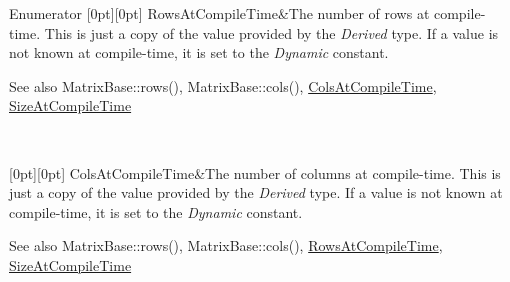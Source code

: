 \begin{DoxyEnumFields}{Enumerator}
[0pt][0pt]{}\mbox{\label{class_eigen_1_1_dense_base_a86241c772c74c04eeeb0480b99c5ab77adb37c78ebbf15aa20b65c3b70415a1ab}} 
Rows\+At\+Compile\+Time&The number of rows at compile-\/time. This is just a copy of the value provided by the {\itshape Derived} type. If a value is not known at compile-\/time, it is set to the {\itshape Dynamic} constant. \begin{DoxySeeAlso}{See also}
Matrix\+Base\+::rows(), Matrix\+Base\+::cols(), \mbox{\hyperlink{class_eigen_1_1_dense_base_a86241c772c74c04eeeb0480b99c5ab77a787f85fd67ee5985917eb2cef6e70441}{Cols\+At\+Compile\+Time}}, \mbox{\hyperlink{class_eigen_1_1_dense_base_a86241c772c74c04eeeb0480b99c5ab77a25cb495affdbd796198462b8ef06be91}{Size\+At\+Compile\+Time}} 
\end{DoxySeeAlso}
\\
\hline

[0pt][0pt]{}\mbox{\label{class_eigen_1_1_dense_base_a86241c772c74c04eeeb0480b99c5ab77a787f85fd67ee5985917eb2cef6e70441}} 
Cols\+At\+Compile\+Time&The number of columns at compile-\/time. This is just a copy of the value provided by the {\itshape Derived} type. If a value is not known at compile-\/time, it is set to the {\itshape Dynamic} constant. \begin{DoxySeeAlso}{See also}
Matrix\+Base\+::rows(), Matrix\+Base\+::cols(), \mbox{\hyperlink{class_eigen_1_1_dense_base_a86241c772c74c04eeeb0480b99c5ab77adb37c78ebbf15aa20b65c3b70415a1ab}{Rows\+At\+Compile\+Time}}, \mbox{\hyperlink{class_eigen_1_1_dense_base_a86241c772c74c04eeeb0480b99c5ab77a25cb495affdbd796198462b8ef06be91}{Size\+At\+Compile\+Time}} 
\end{DoxySeeAlso}
\\
\hline


\end{DoxyEnumFields}
